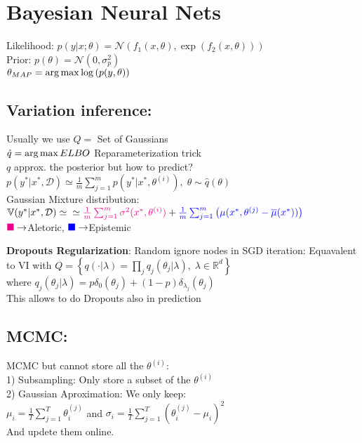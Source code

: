 \section{Bayesian Neural Nets}
Likelihood: $p(y\vert x;\theta) = \mathcal{N}(f_1(x,\theta), \exp{(f_2(x,\theta))})$\\
Prior: $p(\theta) = \mathcal{N}(0, \sigma_p^2)$\\
$\theta_{MAP} = \operatorname*{arg\,max} \log{(p(y, \theta))}$

\subsection{Variation inference:} Usually we use $Q =$ Set of Gaussians\\
 $\hat q =  \operatorname*{arg\,max} ELBO$ {\scriptsize Reparameterization trick}\\
$q$ approx. the posterior but how to predict?\\
$p(y^*\vert x^*, \mathcal{D})\simeq \frac{1}{m}\sum_{j=1}^m p(y^*\vert x^*, \theta^{(i)}),\;\theta \sim \hat q(\theta)$ \\
Gaussian Mixture distribution:
$\mathbb{V}(y^*\vert x^*,\mathcal{D}) \simeq \\
\simeq \begingroup\color{magenta}\frac{1}{m}\sum_{j=1}^m \sigma^2(x^*, \theta^{(i)})\endgroup + \begingroup\color{blue}\frac{1}{m}\sum_{j=1}^m\left(\mu(x^*,\theta^{(j)}-\bar\mu(x^*))\right)\endgroup$\\
$\begingroup\color{magenta}\blacksquare\endgroup \to $Aletoric,
$\begingroup\color{blue}\blacksquare\endgroup \to $Epistemic

\textbf{Dropouts Regularization}: Random ignore nodes in SGD iteration: 
Equavalent to VI with $Q = \left\{q(\cdot\vert \lambda) = \prod_j q_j(\theta_j\vert \lambda), \; \lambda \in \mathbb{R}^d \right\}$\\
where $q_j(\theta_j\vert \lambda) = p\delta_0(\theta_j) +  (1-p)\delta_{\lambda_j}(\theta_j)$\\
This allows to do Dropouts also in prediction

\subsection{MCMC:} MCMC but cannot store all the $\theta^{(i)}$:\\
1) Subsampling: Only store a subset of the  $\theta^{(i)}$\\
2) Gaussian Aproximation: We only keep:\\
$\mu_i=\frac{1}{T}\sum_{j=1}^T \theta_i^{(j)}$ and $\sigma_i=\frac{1}{T}\sum_{j=1}^T (\theta_i^{(j)}-\mu_i)^2$\\
And updete them online. 

